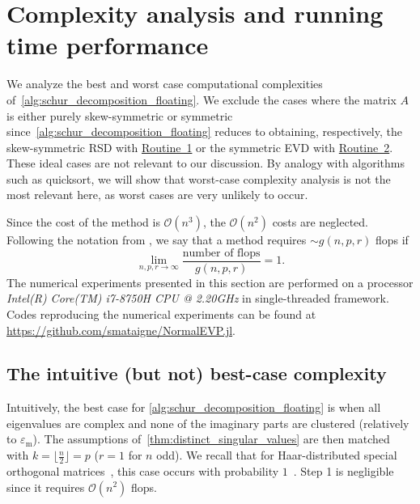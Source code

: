 \documentclass[10pt,twoside,dvipsnames]{siamart1116}
\numberwithin{algorithm}{section}
\numberwithin{equation}{section}
\newcommand{\wordref}[2]{\hyperlink{#1}{#2}}
\newcommand{\simcom}{\textcolor{blue}{SM:} \textcolor{blue}}
\begin{document}
	\section{Complexity analysis and running time performance}\label{sec:best_worst_case}
	We analyze the best and worst case computational complexities of~\cref{alg:schur_decomposition_floating}. We exclude the cases where the matrix $A$ is either purely skew-symmetric or symmetric since~\cref{alg:schur_decomposition_floating} reduces to obtaining, respectively, the skew-symmetric RSD with \wordref{oracle1}{Routine~1} or the symmetric EVD with \wordref{oracle2}{Routine~2}. These ideal cases are not relevant to our discussion. By analogy with algorithms such as quicksort, we will show that worst-case complexity analysis is not the most relevant here, as worst cases are very unlikely to occur.
	
	Since the cost of the method is $\mathcal{O}(n^3)$, the $\mathcal{O}(n^2)$ costs are neglected. Following the notation from \cite[Lec.~8]{trefethen97}, we say that a method requires $\sim g(n,p,r)$ flops if \begin{equation}
	\lim_{n,p,r\rightarrow \infty} \frac{\text{number of flops}}{g(n,p,r)}=1.
\end{equation} The numerical experiments presented in this section are performed on a processor \emph{Intel(R) Core(TM) i7-8750H CPU @ 2.20GHz} in single-threaded framework. Codes reproducing the numerical experiments can be found at \url{https://github.com/smataigne/NormalEVP.jl}.
	\subsection{The intuitive (but not) best-case complexity}\label{subsec:best_complexity}
	Intuitively, the best case for \cref{alg:schur_decomposition_floating} is when all eigenvalues are complex and none of the imaginary parts are clustered (relatively to $\varepsilon_\mathrm{m}$). The assumptions of~\cref{thm:distinct_singular_values} are then matched with $k=\lfloor\frac{n}{2}\rfloor=p$ ($r=1$ for $n$ odd). We recall that for Haar-distributed special orthogonal matrices~\cite{Anderson87, Stewart80}, this case occurs with probability $1$~\cite{Fasi21}. %
	Step 1 is negligible since it requires $\mathcal{O}(n^2)$ flops.
	
\end{document}
